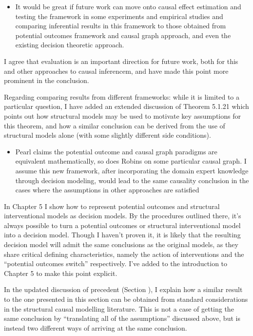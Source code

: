 \documentclass[12pt, a4paper]{article}
\begin{document}
\begin{itemize}
    \item It would be great if future work can move onto causal effect estimation and testing the framework in some experiments and empirical studies and comparing inferential results in this framework to those obtained from potential outcomes framework and causal graph approach, and even the existing decision theoretic approach.
\end{itemize}

I agree that evaluation is an important direction for future work, both for this and other approaches to causal inferencem, and have made this point more prominent in the conclusion.

Regarding comparing results from different frameworks: while it is limited to a particular question, I have added an extended discussion of Theorem 5.1.21 which points out how structural models may be used to motivate key assumptions for this theorem, and how a similar conclusion can be derived from the use of structural models alone (with some slightly different side conditions).

\begin{itemize}
    \item Pearl claims the potential outcome and causal graph paradigms are equivalent mathematically, so does Robins on some particular causal graph. I assume this new framework, after incorporating the domain expert knowledge through decision modeling, would lead to the same causality conclusion in the cases where the assumptions in other approaches are satisfied
\end{itemize}

In Chapter 5 I show how to represent potential outcomes and structural interventional models as decision models. By the procedures outlined there, it's always possible to turn a potential outcomes or structural interventional model into a decision model. Though I haven't proven it, it is likely that the resulting decision model will admit the same conclusions as the original models, as they share critical defining characteristics, namely the action of interventions and the ``potential outcomes switch'' respectively. I've added to the introduction to Chapter 5 to make this point explicit.

In the updated discussion of precedent (Section ), I explain how a similar result to the one presented in this section can be obtained from standard considerations in the structural causal modelling literature. This is not a case of getting the same conclusion by ``translating all of the assumptions'' discussed above, but is instead two different ways of arriving at the same conclusion.
\end{document}
